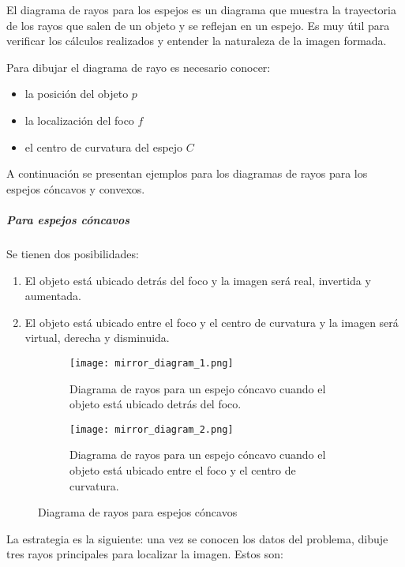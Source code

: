 El diagrama de rayos para los espejos es un diagrama que muestra la trayectoria de los rayos que salen de un objeto y se reflejan en un espejo. Es muy útil para verificar los cálculos realizados y entender la naturaleza de la imagen formada.

\noindent Para dibujar el diagrama de rayo es necesario conocer:
\begin{itemize}
  \item la posición del objeto \(p\)
  \item la localización del foco \(f\)
  \item el centro de curvatura del espejo \(C\)
\end{itemize}

\noindent A continuación se presentan ejemplos para los diagramas de rayos para los espejos cóncavos y convexos.

\subparagraph{Para espejos cóncavos}

Se tienen dos posibilidades:
\begin{enumerate}
  \item El objeto está ubicado detrás del foco y la imagen será real, invertida y aumentada.
  \item El objeto está ubicado entre el foco y el centro de curvatura y la imagen será virtual, derecha y disminuida.
\end{enumerate}

\begin{figure}[ht]
  \centering
  \begin{subfigure}[b]{0.49\textwidth}
      \centering
      \texttt{[image: mirror\_diagram\_1.png]}
      \caption{Diagrama de rayos para un espejo cóncavo cuando el objeto está ubicado detrás del foco.}
      \label{fig:mirror_diagram_1}
  \end{subfigure}
  \hfill
  \begin{subfigure}[b]{0.49\textwidth}
      \centering
      \texttt{[image: mirror\_diagram\_2.png]}
      \caption{Diagrama de rayos para un espejo cóncavo cuando el objeto está ubicado entre el foco y el centro de curvatura.}
      \label{fig:mirror_diagram_2}
  \end{subfigure}
  \caption{Diagrama de rayos para espejos cóncavos}
  \label{fig:mirror_diagram}
\end{figure}

\noindent La estrategia es la siguiente: una vez se conocen los datos del problema, dibuje tres rayos principales para localizar la imagen. Estos son:

